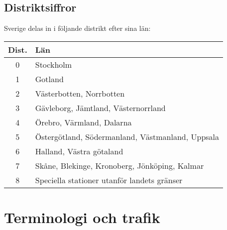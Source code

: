 \documentclass[10pt,swedish,a4paper,twoside]{article}
\begin{document}
\subsection{Distriktsiffror}

Sverige delas in i följande distrikt efter sina län:

\begin{center}
\begin{tabular}{cl}
	\textbf{Dist.} & \textbf{Län}                                     \\ \hline
	      0        & Stockholm                                        \\
	      1        & Gotland                                          \\
	      2        & Västerbotten, Norrbotten                         \\
	      3        & Gävleborg, Jämtland, Västernorrland              \\
	      4        & Örebro, Värmland, Dalarna                        \\
	      5        & Östergötland, Södermanland, Västmanland, Uppsala \\
	      6        & Halland, Västra götaland                         \\
	      7        & Skåne, Blekinge, Kronoberg, Jönköping, Kalmar    \\
	      8        & Speciella stationer utanför landets gränser
\end{tabular}
\end{center}

\section{Terminologi och trafik}
\end{document}
